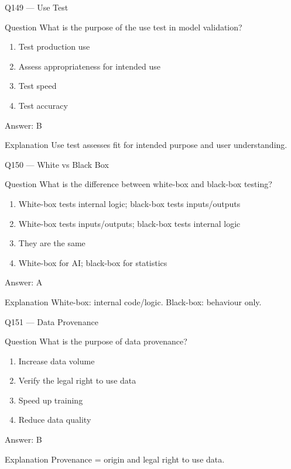 \documentclass[aspectratio=169,8pt]{beamer}
\begin{document}
	\begin{frame}{Q149 --- Use Test}
		\begin{block}{Question}
			What is the purpose of the use test in model validation?
		\end{block}
		\begin{enumerate}
			\item Test production use
			\item Assess appropriateness for intended use
			\item Test speed
			\item Test accuracy
		\end{enumerate}
		\begin{exampleblock}{Answer: B}\end{exampleblock}
		\begin{block}{Explanation}
			Use test assesses fit for intended purpose and user understanding.
		\end{block}
	\end{frame}
	
	\begin{frame}{Q150 --- White vs Black Box}
		\begin{block}{Question}
			What is the difference between white-box and black-box testing?
		\end{block}
		\begin{enumerate}
			\item White-box tests internal logic; black-box tests inputs/outputs
			\item White-box tests inputs/outputs; black-box tests internal logic
			\item They are the same
			\item White-box for AI; black-box for statistics
		\end{enumerate}
		\begin{exampleblock}{Answer: A}\end{exampleblock}
		\begin{block}{Explanation}
			White-box: internal code/logic. Black-box: behaviour only.
		\end{block}
	\end{frame}
	
	\begin{frame}{Q151 --- Data Provenance}
		\begin{block}{Question}
			What is the purpose of data provenance?
		\end{block}
		\begin{enumerate}
			\item Increase data volume
			\item Verify the legal right to use data
			\item Speed up training
			\item Reduce data quality
		\end{enumerate}
		\begin{exampleblock}{Answer: B}\end{exampleblock}
		\begin{block}{Explanation}
			Provenance = origin and legal right to use data.
		\end{block}
	\end{frame}
	
\end{document}
